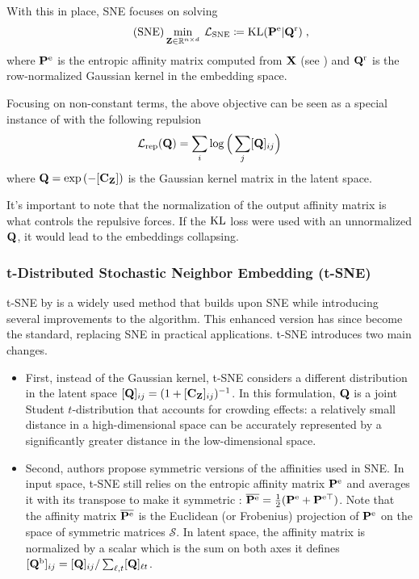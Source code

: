 With this in place, SNE focuses on solving
\begin{align}\label{eq:SNE_pb}\tag{SNE}
    \min_{{\mathbf{Z}} \in \mathbb{R}^{n \times d}} \: \mathcal{L}_{\mathrm{SNE}} \coloneqq \operatorname{KL}({\mathbf{P}}^{\mathrm{e}} | {\mathbf{Q}}^{\mathrm{r}}) \;,
\end{align}
where ${\mathbf{P}}^{\mathrm{e}}$ is the entropic affinity matrix computed from ${\mathbf{X}}$ (see ) and ${\mathbf{Q}}^{\mathrm{r}}$ is the row-normalized Gaussian kernel in the embedding space.

Focusing on non-constant terms, the above objective can be seen as a special instance of  with the following repulsion
\begin{align}
    \mathcal{L}_{\mathrm{rep}}({\mathbf{Q}}) = \sum_{i} \log \Big(\sum_j [{\mathbf{Q}}]_{ij} \Big)
\end{align}
where ${\mathbf{Q}} = \exp{(-[{\mathbf{C}}_{{\mathbf{Z}}}])}$ is the Gaussian kernel matrix in the latent space.

\begin{remark}\label{rem:norm_as_repulsion}
    It's important to note that the normalization of the output affinity matrix is what controls the repulsive forces. If the $\operatorname{KL}$ loss were used with an unnormalized ${\mathbf{Q}}$, it would lead to the embeddings collapsing.
\end{remark}

\subsubsection{t-Distributed Stochastic Neighbor Embedding (t-SNE)}

t-SNE by \citet{van2008visualizing} is a widely used method that builds upon SNE while introducing several improvements to the algorithm. This enhanced version has since become the standard, replacing SNE in practical applications. t-SNE introduces two main changes. 
\begin{itemize}
    \item First, instead of the Gaussian kernel, t-SNE considers a different distribution in the latent space $[{\mathbf{Q}}]_{ij} = (1 + [\mathbf{C}_{\mathbf{Z}}]_{ij})^{-1}$. In this formulation, ${\mathbf{Q}}$ is a joint Student $t$-distribution that accounts for crowding effects: a relatively small
    distance in a high-dimensional space can be accurately represented by a
    significantly greater distance in the low-dimensional space. 
    \item Second, authors propose symmetric versions of the affinities used in SNE. In input space, t-SNE still relies on the entropic affinity matrix ${\mathbf{P}}^{\mathrm{e}}$ and averages it with its transpose to make it symmetric : $\overline{{\mathbf{P}}^{\mathrm{e}}} = \frac{1}{2}({\mathbf{P}}^{\mathrm{e}} + {\mathbf{P}}^{\mathrm{e} \top})$. Note that the affinity matrix $\overline{{\mathbf{P}}^{\mathrm{e}}}$ is the Euclidean (or Frobenius) projection of ${\mathbf{P}}^{\mathrm{e}}$ on the space of symmetric matrices $\mathcal{S}$. In latent space, the affinity matrix is normalized by a scalar which is the sum on both axes \ie it defines $[{\mathbf{Q}}^{\mathrm{b}}]_{ij} = [{\mathbf{Q}}]_{ij} /\sum_{\ell,t}[{\mathbf{Q}}]_{\ell t}$.
\end{itemize}

